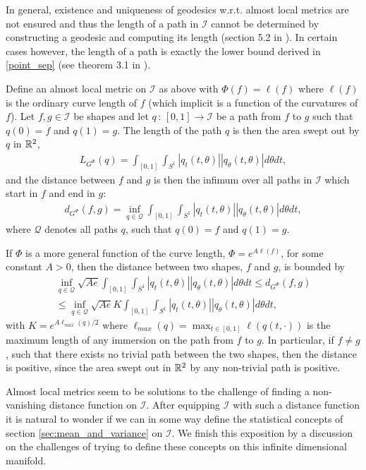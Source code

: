In general, existence and uniqueness of geodesics w.r.t. almost local metrics are not ensured and thus the length of a path in $\mathcal{I}$ cannot be determined by constructing a geodesic and computing its length (section 5.2 in \cite{bauer2014overview}). In certain cases however, the length of a path is exactly the lower bound derived in \ref{point_sep} (see theorem 3.1 in \cite{shah2007h0type}).

\begin{example}
  \label{ex:almost-local-calculate-length}
Define an almost local metric on $\mathcal{I}$ as above with $\Phi(f) = \ell(f)$ where $\ell(f)$ is the ordinary curve length of $f$ (which implicit is a function of the curvatures of $f$). Let $f, g \in \mathcal{I}$ be shapes and let $q \, : \, [0,1] \rightarrow \mathcal{I}$ be a path from $f$ to $g$ such that $q(0) = f$ and $q(1) = g$. The length of the path $q$ is then the area swept out by $q$ in $\mathbb{R}^2$,
\begin{align*}
L_{G^\Phi}(q) = \int_{[0,1]} \int_{S^1} \left| q_t(t, \theta) \right| \left| q_\theta(t, \theta) \right| d\theta dt,
\end{align*}
and the distance between $f$ and $g$ is then the infimum over all paths in $\mathcal{I}$ which start in $f$ and end in $g$:
\begin{align*}
d_{G^\Phi}(f, g) = \inf_{q\in\mathcal{Q}} \int_{[0,1]} \int_{S^1} \left| q_t(t, \theta) \right| \left| q_\theta(t, \theta) \right| d\theta dt,
\end{align*}
where $\mathcal{Q}$ denotes all paths $q$, such that $q(0) = f$ and $q(1) = g$.
\end{example}
\begin{example}
If $\Phi$ is a more general function of the curve length, $\Phi = e^{A \ell (f)}$, for some constant $A > 0$, then the distance between two shapes, $f$ and $g$, is bounded by
\begin{align*}
\inf_{q\in\mathcal{Q}} \sqrt{A e} \int_{[0,1]} \int_{S^1} \left| q_t(t, \theta) \right| \left| q_\theta(t, \theta) \right| d\theta dt \leq d_{G^\Phi}(f, g) \\
 \leq \inf_{q\in\mathcal{Q}} \sqrt{A e} K \int_{[0,1]} \int_{S^1} \left| q_t(t, \theta) \right| \left| q_\theta(t, \theta) \right| d\theta dt,
\end{align*}
with $K = e^{A \ell_{max}(q) / 2}$ where $\ell_{max} (q) = \max_{t \in [0,1]} \ell (q(t, \cdot))$ is the maximum length of any immersion on the path from $f$ to $g$. In particular, if $f \neq g$, such that there exists no trivial path between the two shapes, then the distance is positive, since the area swept out in $\mathbb{R}^2$ by any non-trivial path is positive.
\end{example}
Almost local metrics seem to be solutions to the challenge of finding a non-vanishing distance function on $\mathcal{I}$. After equipping $\mathcal{I}$ with such a distance function it is natural to wonder if we can in some way define the statistical concepts of section \ref{sec:mean_and_variance} on $\mathcal{I}$. We finish this exposition by a discussion on the challenges of trying to define these concepts on this infinite dimensional manifold.




